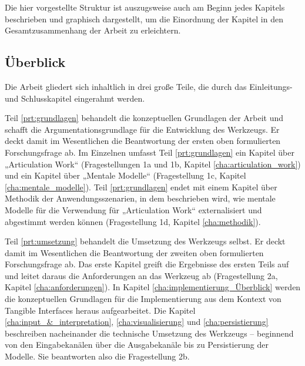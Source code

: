 Die hier vorgestellte Struktur ist auszugsweise auch am Beginn jedes Kapitels beschrieben und graphisch dargestellt, um die Einordnung der Kapitel in den Gesamtzusammenhang der Arbeit zu erleichtern.

\subsection{Überblick} %
\label{sub:aufbau_ueberblick}

Die Arbeit gliedert sich inhaltlich in drei große Teile, die durch das Einleitungs- und Schlusskapitel eingerahmt werden.

Teil \ref{prt:grundlagen} behandelt die konzeptuellen Grundlagen der Arbeit und schafft die Argumentationsgrundlage für die Entwicklung des Werkzeugs. Er deckt damit im Wesentlichen die Beantwortung der ersten oben formulierten Forschungsfrage ab. Im Einzelnen umfasst Teil \ref{prt:grundlagen} ein Kapitel über „Articulation Work“ (Fragestellungen 1a und 1b, Kapitel \ref{cha:articulation_work}) und ein Kapitel über „Mentale Modelle“ (Fragestellung 1c, Kapitel \ref{cha:mentale_modelle}). Teil \ref{prt:grundlagen} endet mit einem Kapitel über Methodik der Anwendungsszenarien, in dem beschrieben wird, wie mentale Modelle für die Verwendung für „Articulation Work“ externalisiert und abgestimmt werden können (Fragestellung 1d, Kapitel \ref{cha:methodik}).

Teil \ref{prt:umsetzung} behandelt die Umsetzung des Werkzeugs selbst. Er deckt damit im Wesentlichen die Beantwortung der zweiten oben formulierten Forschungsfrage ab. Das erste Kapitel greift die Ergebnisse des ersten Teils auf und leitet daraus die Anforderungen an das Werkzeug ab (Fragestellung 2a, Kapitel \ref{cha:anforderungen}). In Kapitel \ref{cha:implementierung_Überblick} werden die konzeptuellen Grundlagen für die Implementierung aus dem Kontext von Tangible Interfaces heraus aufgearbeitet. Die Kapitel \ref{cha:input_&_interpretation}, \ref{cha:visualisierung} und \ref{cha:persistierung} beschreiben nacheinander die technische Umsetzung des Werkzeugs -- beginnend von den Eingabekanälen über die Ausgabekanäle bis zu Persistierung der Modelle. Sie beantworten also die Fragestellung 2b. 

